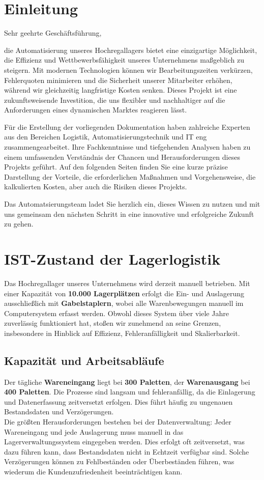 \chapter{Einleitung}

Sehr geehrte Geschäftsführung,  

die Automatisierung unseres Hochregallagers bietet eine einzigartige Möglichkeit, die Effizienz und Wettbewerbsfähigkeit unseres Unternehmens maßgeblich zu steigern. Mit modernen Technologien können wir Bearbeitungszeiten verkürzen, Fehlerquoten minimieren und die Sicherheit unserer Mitarbeiter erhöhen, während wir gleichzeitig langfristige Kosten senken. Dieses Projekt ist eine zukunftsweisende Investition, die uns flexibler und nachhaltiger auf die Anforderungen eines dynamischen Marktes reagieren lässt.  

Für die Erstellung der vorliegenden Dokumentation haben zahlreiche Experten aus den Bereichen Logistik, Automatisierungstechnik und IT eng zusammengearbeitet. Ihre Fachkenntnisse und tiefgehenden Analysen haben zu einem umfassenden Verständnis der Chancen und Herausforderungen dieses Projekts geführt. Auf den folgenden Seiten finden Sie eine kurze präzise Darstellung der Vorteile, die erforderlichen Maßnahmen und Vorgehensweise, die kalkulierten Kosten, aber auch die Risiken dieses Projekts.  

Das Automatsierungsteam ladet Sie herzlich ein, dieses Wissen zu nutzen und mit uns gemeinsam den nächsten Schritt in eine innovative und erfolgreiche Zukunft zu gehen. 


\chapter{IST-Zustand der Lagerlogistik} 

Das Hochregallager unseres Unternehmens wird derzeit manuell betrieben. Mit einer Kapazität von \textbf{10.000 Lagerplätzen} erfolgt die Ein- und Auslagerung ausschließlich mit \textbf{Gabelstaplern}, wobei alle Warenbewegungen manuell im Computersystem erfasst werden. Obwohl dieses System über viele Jahre zuverlässig funktioniert hat, stoßen wir zunehmend an seine Grenzen, insbesondere in Hinblick auf Effizienz, Fehleranfälligkeit und Skalierbarkeit.

\section*{Kapazität und Arbeitsabläufe}
Der tägliche \textbf{Wareneingang} liegt bei \textbf{300 Paletten}, der \textbf{Warenausgang} bei \textbf{400 Paletten}. Die Prozesse sind langsam und fehleranfällig, da die Einlagerung und Datenerfassung zeitversetzt erfolgen. Dies führt häufig zu ungenauen Bestandsdaten und Verzögerungen.\\ 
Die größten Herausforderungen bestehen bei der Datenverwaltung: Jeder Wareneingang und jede Auslagerung muss manuell in das Lagerverwaltungssystem eingegeben werden. Dies erfolgt oft zeitversetzt, was dazu führen kann, dass Bestandsdaten nicht in Echtzeit verfügbar sind. Solche Verzögerungen können zu Fehlbeständen oder Überbeständen führen, was wiederum die Kundenzufriedenheit beeinträchtigen kann.

